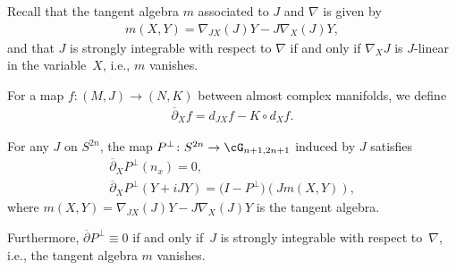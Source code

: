 Recall that the tangent algebra $m$ associated to $J$ and $\nabla$ is given by
\begin{gather*}
m(X,Y) = \nabla_{JX} (J)Y - J \nabla_X (J) Y,
\end{gather*}
and that $J $ is strongly integrable with respect to $\nabla$ if and only if $\nabla_X J$ is $J$-linear in the variable~$X$, i.e., $m$ vanishes.

For a map $f\colon (M,J) \to (N,K) $ between almost complex manifolds, we define
\begin{gather*}
\overline{\partial}_X f = d_{JX} f - K \circ d_X f.
\end{gather*}

\begin{thm} \label{thm;delbarPperp}
For any $J$ on $S^{2n}$, the map $P^\perp\colon S^{2n} \to \cG_{n+1,2n+1}$ induced by $J$ satisfies
\begin{gather*}
\overline{\partial}_X P^\perp (n_x) = 0, \\
\overline{\partial}_X P^\perp (Y+iJY) = \big( I - P^\perp\big) (J m(X,Y)),
\end{gather*}
where $m(X,Y) = \nabla_{JX} (J)Y - J \nabla_X (J) Y$ is the tangent algebra.

Furthermore, $\overline{\partial} P^\perp \equiv 0$ if and only if~$J $ is strongly integrable with respect to~$\nabla$, i.e., the tangent algebra $m$ vanishes.
\end{thm}

